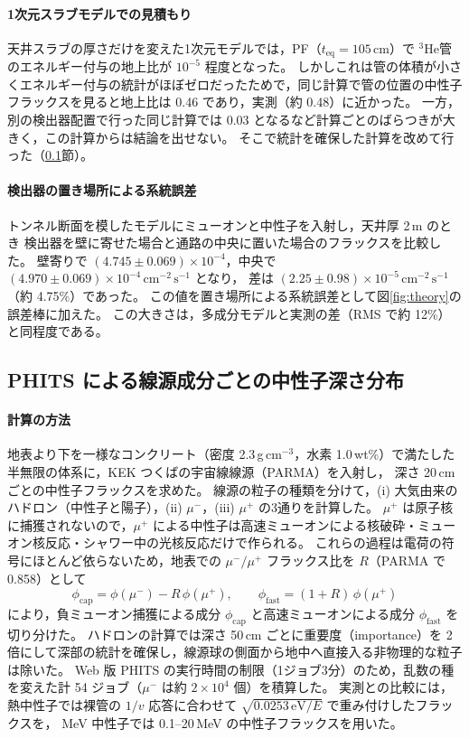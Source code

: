 \documentclass[a4paper,11pt]{ltjsarticle}
\newcommand{\He}{\ensuremath{{}^{3}\mathrm{He}}}
\newcommand{\teq}{t_{\mathrm{eq}}}
\newcommand{\flux}{\mathrm{cm^{-2}\,s^{-1}}}
\begin{document}
\paragraph{1次元スラブモデルでの見積もり}
天井スラブの厚さだけを変えた1次元モデルでは，PF（$\teq=105$\,cm）で
\He 管のエネルギー付与の地上比が $10^{-5}$ 程度となった。
しかしこれは管の体積が小さくエネルギー付与の統計がほぼゼロだったためで，同じ計算で管の位置の中性子フラックスを見ると地上比は 0.46 であり，実測（約 0.48）に近かった。
一方，別の検出器配置で行った同じ計算では 0.03 となるなど計算ごとのばらつきが大きく，この計算からは結論を出せない。
そこで統計を確保した計算を改めて行った（\ref{sec:phitscomp}節）。

\paragraph{検出器の置き場所による系統誤差}
トンネル断面を模したモデルにミューオンと中性子を入射し，天井厚 2\,m のとき
検出器を壁に寄せた場合と通路の中央に置いた場合のフラックスを比較した。
壁寄りで $(4.745\pm0.069)\times10^{-4}$，中央で $(4.970\pm0.069)\times10^{-4}\,\flux$ となり，
差は $(2.25\pm0.98)\times10^{-5}\,\flux$（約 4.75\%）であった。
この値を置き場所による系統誤差として図\ref{fig:theory}の誤差棒に加えた。
この大きさは，多成分モデルと実測の差（RMS で約 12\%）と同程度である。

\subsection{PHITS による線源成分ごとの中性子深さ分布}
\label{sec:phitscomp}

\paragraph{計算の方法}
地表より下を一様なコンクリート（密度 2.3\,g\,cm$^{-3}$，水素 1.0\,wt\%）で満たした半無限の体系に，KEK つくばの宇宙線線源（PARMA）を入射し，
深さ 20\,cm ごとの中性子フラックスを求めた。
線源の粒子の種類を分けて，(i) 大気由来のハドロン（中性子と陽子），(ii) $\mu^-$，(iii) $\mu^+$ の3通りを計算した。
$\mu^+$ は原子核に捕獲されないので，$\mu^+$ による中性子は高速ミューオンによる核破砕・ミューオン核反応・シャワー中の光核反応だけで作られる。
これらの過程は電荷の符号にほとんど依らないため，地表での $\mu^-/\mu^+$ フラックス比を $R$（PARMA で 0.858）として
\begin{equation}
  \phi_{\mathrm{cap}} = \phi(\mu^-) - R\,\phi(\mu^+), \qquad \phi_{\mathrm{fast}} = (1+R)\,\phi(\mu^+)
\end{equation}
により，負ミューオン捕獲による成分 $\phi_{\mathrm{cap}}$ と高速ミューオンによる成分 $\phi_{\mathrm{fast}}$ を切り分けた。
ハドロンの計算では深さ 50\,cm ごとに重要度（importance）を 2 倍にして深部の統計を確保し，線源球の側面から地中へ直接入る非物理的な粒子は除いた。
Web 版 PHITS の実行時間の制限（1ジョブ3分）のため，乱数の種を変えた計 54 ジョブ（$\mu^-$ は約 $2\times10^4$ 個）を積算した。
実測との比較には，熱中性子では裸管の $1/v$ 応答に合わせて $\sqrt{0.0253\,\mathrm{eV}/E}$ で重み付けしたフラックスを，
MeV 中性子では 0.1--20\,MeV の中性子フラックスを用いた。
\end{document}
